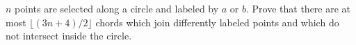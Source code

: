$n$ points are selected along a circle and labeled by $a$ or $b$. Prove that there are at most $\lfloor (3n + 4)/2 \rfloor$ chords which join differently labeled points and which do not intersect inside the circle.
